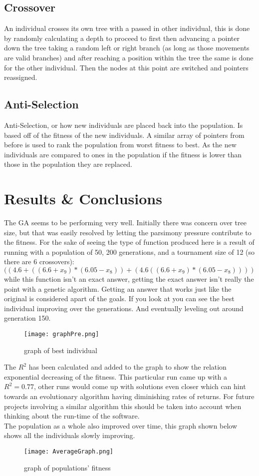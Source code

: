 \documentclass[twoside]{article}
\begin{document}
\begin{multicols}{2}
\subsection{Crossover}
An individual crosses its own tree with a passed in other individual, this is done by randomly calculating a depth to proceed to first then advancing a pointer down the tree taking a random left or right branch (as long as those movements are valid branches) and after reaching a position within the tree the same is done for the other individual. Then the nodes at this point are switched and pointers reassigned.

\subsection{Anti-Selection}
Anti-Selection, or how new individuals are placed back into the population. Is based off of the fitness of the new individuals. A similar array of pointers from before is used to rank the population from worst fitness to best. As the new individuals are compared to ones in the population if the fitness is lower than those in the population they are replaced.

\section{Results \& Conclusions}
The GA seems to be performing very well. Initially there was concern over tree size, but that was easily resolved by letting the parsimony pressure contribute to the fitness. For the sake of seeing the type of function produced here is a result of running with a population of 50, 200 generations, and a tournament size of 12 (so there are 6 crossovers): $((4.6+((6.6+x_9)*(6.05-x_8))+(4.6((6.6+x_9)*(6.05-x_8))))$ while this function isn't an exact answer, getting the exact answer isn't really the point with a genetic algorithm. Getting an answer that works just like the original is considered apart of the goals. If you look at you can see the best individual improving over the generations. And eventually leveling out around generation 150.

\begin{figure}[H]
		\label{fig:Best}
		\texttt{[image: graphPre.png]}
		\caption{graph of best individual}
\end{figure}

The $R^2$ has been calculated and added to the graph to show the relation exponential decreasing of the fitness. This particular run came up with a $R^2=0.77$, other runs would come up with solutions even closer which can hint towards an evolutionary algorithm having diminishing rates of returns. For future projects involving a similar algorithm this should be taken into account when thinking about the run-time of the software.\\
The population as a whole also improved over time, this graph shown below shows all the individuals slowly improving.

\begin{figure}[H]
\label{fig:pop}
		\texttt{[image: AverageGraph.png]}
		\caption{graph of populations' fitness}
\end{figure}

\end{multicols}
\end{document}
